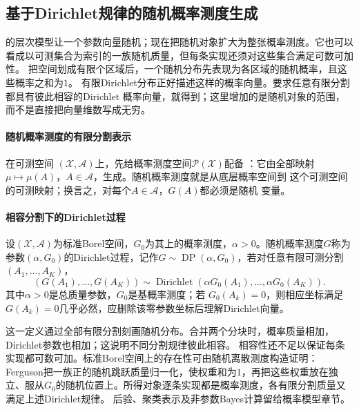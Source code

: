 \subsection{基于Dirichlet规律的随机概率测度生成}
\label{sec:stoch-random-probability-generation}
的层次模型让一个参数向量随机；现在把随机对象扩大为整张概率测度。它也可以看成以可测集合为索引的一族随机质量，但每条实现还须对这些集合满足可数可加性。
把空间划成有限个区域后，一个随机分布先表现为各区域的随机概率，且这些概率之和为$1$。
有限Dirichlet分布正好描述这样的概率向量。要求任意有限分割都具有彼此相容的Dirichlet
概率向量，就得到；这里增加的是随机对象的范围，而不是直接把向量维数写成无穷。
\paragraph{随机概率测度的有限分割表示}
\begin{definition}[随机概率测度]
  \label{def:probability-random-probability-measure}
在可测空间
\((\mathcal X,\mathcal A)\)上，先给概率测度空间\(\mathcal P(\mathcal X)\)配备
：它由全部映射
\(\mu\mapsto\mu(A)\)，\(A\in\mathcal A\)，生成。随机概率测度就是从底层概率空间到
这个可测空间的可测映射；换言之，对每个\(A\in\mathcal A\)，\(G(A)\)都必须是随机
变量。
\end{definition}
\paragraph{相容分割下的Dirichlet过程}
\begin{definition}[Dirichlet过程]
  \label{def:probability-dirichlet-process}
  设\((\mathcal X,\mathcal A)\)为标准Borel空间，\(G_0\)为其上的概率测度，\(\alpha>0\)。随机概率测度\(G\)称为参数\((\alpha,G_0)\)的Dirichlet过程，记作\(G\sim\operatorname{DP}(\alpha,G_0)\)，若对任意有限可测分割
\((A_1,\ldots,A_K)\)，
\[ (G(A_1),\ldots,G(A_K))
  \sim\operatorname{Dirichlet}(\alpha G_0(A_1),\ldots,\alpha G_0(A_K)). \]
其中\(\alpha>0\)是总质量参数，\(G_0\)是基概率测度；若
\(G_0(A_k)=0\)，则相应坐标满足\(G(A_k)=0\)几乎必然，应删除该零参数坐标后理解Dirichlet向量。
\end{definition}
这一定义通过全部有限分割刻画随机分布。合并两个分块时，概率质量相加，Dirichlet参数也相加；这说明不同分割规律彼此相容。
相容性还不足以保证每条实现都可数可加。标准Borel空间上的存在性可由随机离散测度构造证明：Ferguson把一族正的随机跳跃质量归一化，使权重和为\(1\)，再把这些权重放在独立、服从\(G_0\)的随机位置上。所得对象逐条实现都是概率测度，各有限分割质量又满足上述Dirichlet规律。
后验、聚类表示及非参数Bayes计算留给概率模型章节。

